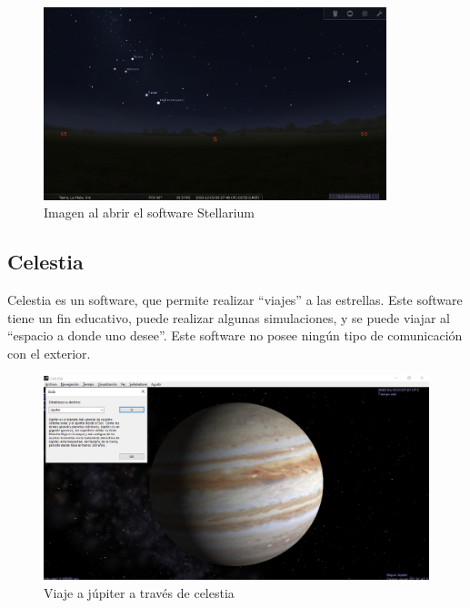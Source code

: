 \begin{figure}[ht]
	\centering
	\includegraphics[width=\linewidth,height= 5.6cm]{stellarium}
	\caption{Imagen al abrir el software Stellarium }
	\label{fig:stelarium_init}
\end{figure}




\subsection{Celestia} 
Celestia es un software, que permite realizar ``viajes'' a las estrellas. Este software tiene un fin educativo, puede realizar algunas simulaciones, y se puede viajar al ``espacio a donde uno desee''. Este software no posee ningún tipo de comunicación con el exterior. 
\begin{figure}[ht]
	\centering
	\includegraphics[scale=0.3]{celestia}
	\caption{Viaje a júpiter a través de celestia}
\end{figure}



